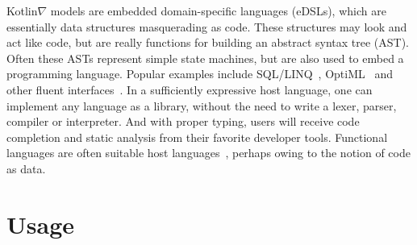 \documentclass[12pt,initial,twoside,maitrise]{dms}
\numberwithin{equation}{section}
\numberwithin{table}{chapter}
\numberwithin{figure}{chapter}
\begin{document}
Kotlin$\nabla$ models are embedded domain-specific languages (eDSLs), which are essentially data structures masquerading as code. These structures may look and act like code, but are really functions for building an abstract syntax tree (AST). Often these ASTs represent simple state machines, but are also used to embed a programming language. Popular examples include SQL/LINQ~\citep{meijer2006linq}, OptiML~\citep{sujeeth2011optiml} and other fluent interfaces~\citep{fowler05fluent}. In a sufficiently expressive host language, one can implement any language as a library, without the need to write a lexer, parser, compiler or interpreter. And with proper typing, users will receive code completion and static analysis from their favorite developer tools. Functional languages are often suitable host languages~\citep{elliott2003compiling,rompf2010lightweight}, perhaps owing to the notion of code as data.

\section{Usage}
\end{document}
